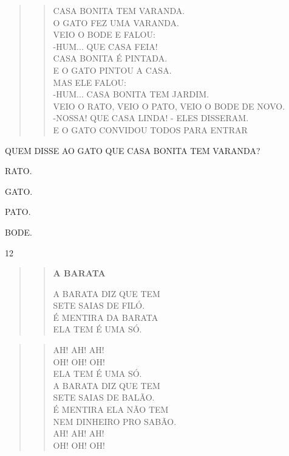 \begin{quote}
\begin{verse}
CASA BONITA TEM VARANDA.\\
O GATO FEZ UMA VARANDA.\\
VEIO O BODE E FALOU:\\
-HUM... QUE CASA FEIA!\\
CASA BONITA É PINTADA.\\
E O GATO PINTOU A CASA.\\
MAS ELE FALOU:\\
-HUM... CASA BONITA TEM JARDIM.\\
VEIO O RATO, VEIO O PATO, VEIO O BODE DE NOVO.\\
-NOSSA! QUE CASA LINDA! - ELES DISSERAM.\\
E O GATO CONVIDOU TODOS PARA ENTRAR
\end{verse}

\end{quote}	

QUEM DISSE AO GATO QUE CASA BONITA TEM VARANDA? 

\begin{escolha}
\item RATO.

\item GATO.

\item PATO.

\item BODE.
\end{escolha}

\num{12}\enlargethispage{2\baselineskip}

\begin{quote}
\begin{verse}
\textbf{A BARATA}

A BARATA DIZ QUE TEM\\
SETE SAIAS DE FILÓ.\\
É MENTIRA DA BARATA\\
ELA TEM É UMA SÓ.
\end{verse}
\end{quote}

\begin{quote}
\begin{verse}
AH! AH! AH!\\
OH! OH! OH!\\
ELA TEM É UMA SÓ.\\
A BARATA DIZ QUE TEM\\
SETE SAIAS DE BALÃO.\\
É MENTIRA ELA NÃO TEM\\
NEM DINHEIRO PRO SABÃO.\\
AH! AH! AH!\\
OH! OH! OH!
\end{verse}

\end{quote}

